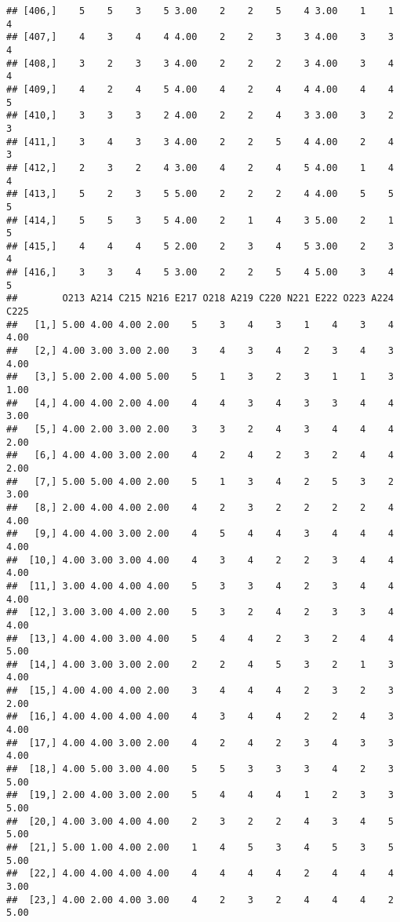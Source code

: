 \documentclass[]{article}
\begin{document}
\begin{verbatim}
## [406,]    5    5    3    5 3.00    2    2    5    4 3.00    1    1    4
## [407,]    4    3    4    4 4.00    2    2    3    3 4.00    3    3    4
## [408,]    3    2    3    3 4.00    2    2    2    3 4.00    3    4    4
## [409,]    4    2    4    5 4.00    4    2    4    4 4.00    4    4    5
## [410,]    3    3    3    2 4.00    2    2    4    3 3.00    3    2    3
## [411,]    3    4    3    3 4.00    2    2    5    4 4.00    2    4    3
## [412,]    2    3    2    4 3.00    4    2    4    5 4.00    1    4    4
## [413,]    5    2    3    5 5.00    2    2    2    4 4.00    5    5    5
## [414,]    5    5    3    5 4.00    2    1    4    3 5.00    2    1    5
## [415,]    4    4    4    5 2.00    2    3    4    5 3.00    2    3    4
## [416,]    3    3    4    5 3.00    2    2    5    4 5.00    3    4    5
##        O213 A214 C215 N216 E217 O218 A219 C220 N221 E222 O223 A224 C225
##   [1,] 5.00 4.00 4.00 2.00    5    3    4    3    1    4    3    4 4.00
##   [2,] 4.00 3.00 3.00 2.00    3    4    3    4    2    3    4    3 4.00
##   [3,] 5.00 2.00 4.00 5.00    5    1    3    2    3    1    1    3 1.00
##   [4,] 4.00 4.00 2.00 4.00    4    4    3    4    3    3    4    4 3.00
##   [5,] 4.00 2.00 3.00 2.00    3    3    2    4    3    4    4    4 2.00
##   [6,] 4.00 4.00 3.00 2.00    4    2    4    2    3    2    4    4 2.00
##   [7,] 5.00 5.00 4.00 2.00    5    1    3    4    2    5    3    2 3.00
##   [8,] 2.00 4.00 4.00 2.00    4    2    3    2    2    2    2    4 4.00
##   [9,] 4.00 4.00 3.00 2.00    4    5    4    4    3    4    4    4 4.00
##  [10,] 4.00 3.00 3.00 4.00    4    3    4    2    2    3    4    4 4.00
##  [11,] 3.00 4.00 4.00 4.00    5    3    3    4    2    3    4    4 4.00
##  [12,] 3.00 3.00 4.00 2.00    5    3    2    4    2    3    3    4 4.00
##  [13,] 4.00 4.00 3.00 4.00    5    4    4    2    3    2    4    4 5.00
##  [14,] 4.00 3.00 3.00 2.00    2    2    4    5    3    2    1    3 4.00
##  [15,] 4.00 4.00 4.00 2.00    3    4    4    4    2    3    2    3 2.00
##  [16,] 4.00 4.00 4.00 4.00    4    3    4    4    2    2    4    3 4.00
##  [17,] 4.00 4.00 3.00 2.00    4    2    4    2    3    4    3    3 4.00
##  [18,] 4.00 5.00 3.00 4.00    5    5    3    3    3    4    2    3 5.00
##  [19,] 2.00 4.00 3.00 2.00    5    4    4    4    1    2    3    3 5.00
##  [20,] 4.00 3.00 4.00 4.00    2    3    2    2    4    3    4    5 5.00
##  [21,] 5.00 1.00 4.00 2.00    1    4    5    3    4    5    3    5 5.00
##  [22,] 4.00 4.00 4.00 4.00    4    4    4    4    2    4    4    4 3.00
##  [23,] 4.00 2.00 4.00 3.00    4    2    3    2    4    4    4    2 5.00

\end{verbatim}
\end{document}
